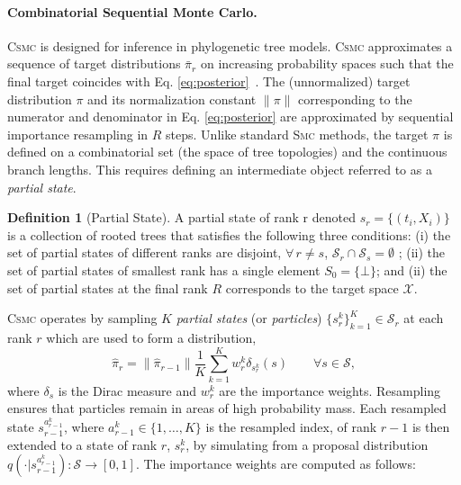 \documentclass[accepted]{uai2021} %
\theoremstyle{definition}
\newtheorem{definition}{Definition}
\begin{document}
\paragraph{Combinatorial Sequential Monte Carlo.}
 \textsc{Csmc} is designed for inference in phylogenetic tree models. \textsc{Csmc} approximates a sequence of target distributions $\bar{\pi}_r$ on increasing probability spaces such that the final target coincides with Eq. \ref{eq:posterior}~\citep{csmc}. The (unnormalized) target distribution  $\pi$ and its normalization constant $\|\pi\|$ corresponding to the numerator and denominator in Eq. \ref{eq:posterior}  are approximated by sequential importance resampling in $R$ steps. Unlike standard \textsc{Smc} methods, the target $\pi$ is defined on a combinatorial set (the space of tree topologies) and the continuous branch lengths. This requires defining an intermediate object referred to as a \textit{partial state}.%
  \begin{definition}[Partial State]
 A partial state of rank r denoted $s_r=\{(t_i,X_i)\}$ is a collection of rooted trees that satisfies the following three conditions: (i) the set of partial states of different ranks are disjoint, $\forall\, r \neq s$, $\mathcal{S}_r \cap \mathcal{S}_s = \emptyset$ ; (ii) the set of partial states of smallest rank has a single element $S_0 = \{\bot \}$; and (ii) the set of partial states at the final rank $R$ corresponds to the target space $\mathcal{X}$.
 \end{definition}
 \textsc{Csmc} operates by sampling $K$ \textit{partial states} (or \textit{particles}) $\{s_{r}^k\}_{k=1}^{K} \in \mathcal{S}_r$ at each rank $r$ which are used to form a distribution,
\begin{equation}
    \widehat{\pi}_{r} = \|\widehat{\pi}_{r-1}\|\frac{1}{K}\sum\limits_{k=1}^{K}w_{r}^k\delta_{s_r^k}(s) \qquad \forall s \in \mathcal{S},
\end{equation}
 where $\delta_s$ is the Dirac measure and $w_{r}^k$ are the importance weights. 
 Resampling ensures that particles remain in areas of high probability mass. Each resampled state $s_{r-1}^{a_{r-1}^k}$, where $a_{r-1}^k \in \{1,\ldots,K\}$ is the resampled index, of rank $r-1$ is then extended to a state of rank $r$, $s_{r}^k$, by simulating from a proposal distribution $q(\cdot |s_{r-1}^{a_{r-1}^k}): \mathcal{S} \rightarrow [0,1]$. The importance weights are computed as follows:
\end{document}
